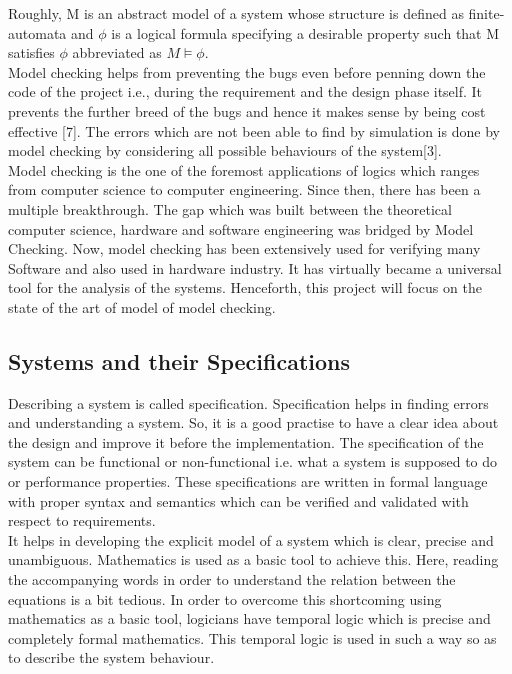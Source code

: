 \documentclass[a4paper,12pt]{extarticle}
\begin{document}
Roughly, M is an abstract model of a system whose structure is defined as finite-automata and $\phi$  is a logical formula specifying a desirable property such that M satisfies $\phi$  abbreviated as $M \models \phi$. \\
Model checking helps from preventing the bugs even before penning down the code of the project i.e., during the requirement and the design phase itself. It prevents the further breed of the bugs and hence it makes sense by being cost effective [7]. The errors which are not been able to find by simulation is done by model checking by considering all possible behaviours of the system[3]. \\
Model checking is the one of the foremost applications of logics which ranges from computer science to computer engineering. Since then, there has been a multiple breakthrough. The gap which was built between the theoretical computer science, hardware and software engineering was bridged by Model Checking. Now, model checking has been extensively used for verifying many Software and also used in hardware industry. It has virtually became a universal tool for the analysis of the systems. Henceforth, this project will focus on the state of the art of model of model checking.
\subsection{Systems and their Specifications}
\label{Sys and Spec}
Describing a system is called specification. Specification helps in finding errors and    understanding a system. So, it is a good practise to have a clear idea about the design and improve it before the implementation. The specification of the system can be functional or non-functional i.e. what a system is supposed to do or performance properties. These specifications are written in formal language with proper syntax and semantics which can be verified and validated with respect to requirements.\\
It helps in developing the explicit model of a system which is clear, precise and unambiguous. Mathematics is used as a basic tool to achieve this. Here, reading the accompanying words in order to understand the relation between the equations is a bit tedious. In order to overcome this shortcoming using mathematics as a basic tool, logicians have temporal logic which is precise and completely formal mathematics. This temporal logic is used in such a way so as to describe the system behaviour.
\end{document}
